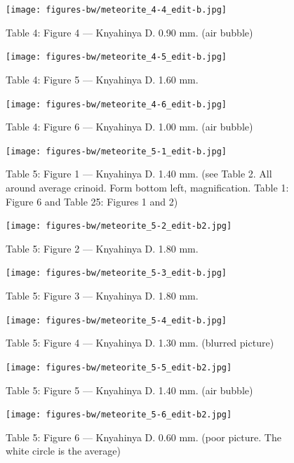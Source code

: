 \documentclass[a4paper, 12pt, oneside]{article}
\begin{document}
\clearpage
\begin{figure}[t]
\texttt{[image: figures-bw/meteorite\_4-4\_edit-b.jpg]}
\caption{Table 4: Figure 4 --- Knyahinya D. 0.90 mm. (air bubble)}
\centering
\end{figure}
\clearpage
\begin{figure}[t]
\texttt{[image: figures-bw/meteorite\_4-5\_edit-b.jpg]}
\caption{Table 4: Figure 5 --- Knyahinya D. 1.60 mm.}
\centering
\end{figure}
\clearpage
\begin{figure}[t]
\texttt{[image: figures-bw/meteorite\_4-6\_edit-b.jpg]}
\caption{Table 4: Figure 6 --- Knyahinya D. 1.00 mm. (air bubble)}
\centering
\end{figure}
\clearpage
{}
\begin{figure}[t]
\texttt{[image: figures-bw/meteorite\_5-1\_edit-b.jpg]}
\caption{Table 5: Figure 1 --- Knyahinya D. 1.40 mm. (see Table 2. All around average crinoid. Form bottom left, magnification. Table 1: Figure 6 and Table 25: Figures 1 and 2)}
\centering
\end{figure}
\clearpage
\begin{figure}[t]
\texttt{[image: figures-bw/meteorite\_5-2\_edit-b2.jpg]}
\caption{Table 5: Figure 2 --- Knyahinya D. 1.80 mm.}
\centering
\end{figure}
\clearpage
\begin{figure}[t]
\texttt{[image: figures-bw/meteorite\_5-3\_edit-b.jpg]}
\caption{Table 5: Figure 3 --- Knyahinya D. 1.80 mm.}
\centering
\end{figure}
\clearpage
\begin{figure}[t]
\texttt{[image: figures-bw/meteorite\_5-4\_edit-b.jpg]}
\caption{Table 5: Figure 4 --- Knyahinya D. 1.30 mm. (blurred picture)}
\centering
\end{figure}
\clearpage
\begin{figure}[t]
\texttt{[image: figures-bw/meteorite\_5-5\_edit-b2.jpg]}
\caption{Table 5: Figure 5 --- Knyahinya D. 1.40 mm. (air bubble)}
\centering
\end{figure}
\clearpage
\begin{figure}[t]
\texttt{[image: figures-bw/meteorite\_5-6\_edit-b2.jpg]}
\caption{Table 5: Figure 6 --- Knyahinya D. 0.60 mm. (poor picture. The white circle is the average)}
\centering
\end{figure}
\end{document}
